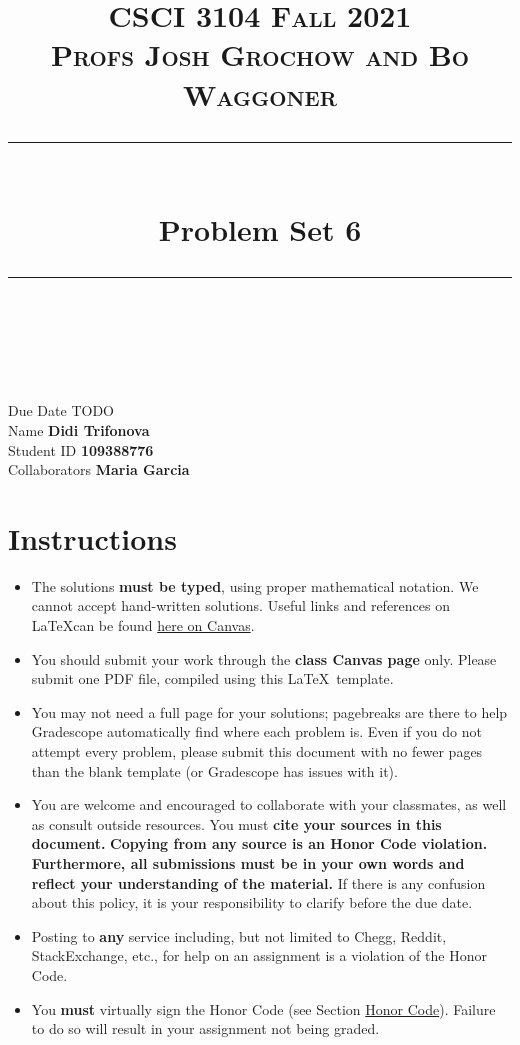\documentclass[11pt]{article}
\title{
\normalfont \normalsize 
\textsc{CSCI 3104 Fall 2021 \\ 
Profs Josh Grochow and Bo Waggoner} \\
[10pt] 
\rule{\linewidth}{0.5pt} \\[6pt] 
\huge Problem Set 6 \\
\rule{\linewidth}{2pt}  \\[10pt]
}
\date{}
\theoremstyle{definition}
\theoremstyle{definition}
\theoremstyle{definition}
\begin{document}
\maketitle


\noindent
Due Date \dotfill TODO \\
Name \dotfill \textbf{Didi Trifonova} \\
Student ID \dotfill \textbf{109388776} \\
Collaborators \dotfill \textbf{Maria Garcia}

\tableofcontents

\section*{Instructions}
 \begin{itemize}
	\item The solutions \textbf{must be typed}, using proper mathematical notation. We cannot accept hand-written solutions. Useful links and references on \LaTeX can be found \href{https://canvas.colorado.edu/courses/75824/pages/latex}{here on Canvas}.
	\item You should submit your work through the \textbf{class Canvas page} only. Please submit one PDF file, compiled using this \LaTeX \ template.
	\item You may not need a full page for your solutions; pagebreaks are there to help Gradescope automatically find where each problem is. Even if you do not attempt every problem, please submit this document with no fewer pages than the blank template (or Gradescope has issues with it).

	\item You are welcome and encouraged to collaborate with your classmates, as well as consult outside resources. You must \textbf{cite your sources in this document.} \textbf{Copying from any source is an Honor Code violation. Furthermore, all submissions must be in your own words and reflect your understanding of the material.} If there is any confusion about this policy, it is your responsibility to clarify before the due date. 

	\item Posting to \textbf{any} service including, but not limited to Chegg, Reddit, StackExchange, etc., for help on an assignment is a violation of the Honor Code.

	\item You \textbf{must} virtually sign the Honor Code (see Section \hyperlink{HonorCode}{Honor Code}). Failure to do so will result in your assignment not being graded.
\end{itemize}
\end{document}
